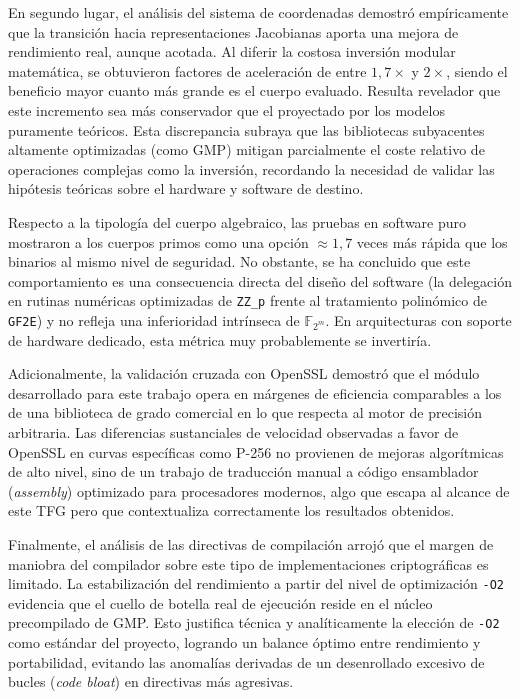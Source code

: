 En segundo lugar, el análisis del sistema de coordenadas demostró empíricamente que la transición hacia representaciones Jacobianas aporta una mejora de rendimiento real, aunque acotada. 
Al diferir la costosa inversión modular matemática, se obtuvieron factores de aceleración de entre $1{,}7\times$ y $2\times$, siendo el beneficio mayor cuanto más grande es el cuerpo evaluado. 
Resulta revelador que este incremento sea más conservador que el proyectado por los modelos puramente teóricos. Esta discrepancia subraya que las bibliotecas subyacentes altamente optimizadas 
(como GMP) mitigan parcialmente el coste relativo de operaciones complejas como la inversión, recordando la necesidad de validar las hipótesis teóricas sobre el hardware y software de destino.

Respecto a la tipología del cuerpo algebraico, las pruebas en software puro mostraron a los cuerpos primos como una opción $\approx 1{,}7$ veces más rápida que los binarios al mismo nivel de 
seguridad. No obstante, se ha concluido que este comportamiento es una consecuencia directa del diseño del software (la delegación en rutinas numéricas optimizadas de \texttt{ZZ\_p} frente al 
tratamiento polinómico de \texttt{GF2E}) y no refleja una inferioridad intrínseca de $\mathbb{F}_{2^m}$. En arquitecturas con soporte de hardware dedicado, esta métrica muy probablemente se 
invertiría.

Adicionalmente, la validación cruzada con OpenSSL demostró que el módulo desarrollado para este trabajo opera en márgenes de eficiencia comparables a los de una biblioteca de grado comercial 
en lo que respecta al motor de precisión arbitraria. Las diferencias sustanciales de velocidad observadas a favor de OpenSSL en curvas específicas como P-256 no provienen de mejoras algorítmicas 
de alto nivel, sino de un trabajo de traducción manual a código ensamblador (\textit{assembly}) optimizado para procesadores modernos, algo que escapa al alcance de este TFG pero que contextualiza 
correctamente los resultados obtenidos.

Finalmente, el análisis de las directivas de compilación arrojó que el margen de maniobra del compilador sobre este tipo de implementaciones criptográficas es limitado. La estabilización del 
rendimiento a partir del nivel de optimización \texttt{-O2} evidencia que el cuello de botella real de ejecución reside en el núcleo precompilado de GMP. Esto justifica técnica y analíticamente 
la elección de \texttt{-O2} como estándar del proyecto, logrando un balance óptimo entre rendimiento y portabilidad, evitando las anomalías derivadas de un desenrollado excesivo de bucles 
(\textit{code bloat}) en directivas más agresivas.

